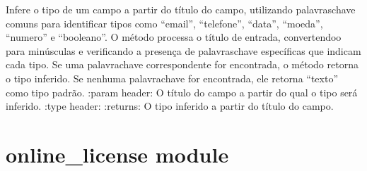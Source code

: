 \documentclass[letterpaper,10pt,english]{sphinxmanual}
\begin{document}
\begin{fulllineitems}
\label{\detokenize{api/models:models.infer_type_from_title}}
\pysigstartsignatures
\pysiglinewithargsret
{}
{}
{}
\pysigstopsignatures
\sphinxAtStartPar
Infere o tipo de um campo a partir do título do campo, utilizando palavras\sphinxhyphen{}chave comuns para identificar tipos como “email”, “telefone”, “data”, “moeda”, “numero” e “booleano”. O método processa o título de entrada, convertendo\sphinxhyphen{}o para minúsculas e verificando a presença de palavras\sphinxhyphen{}chave específicas que indicam cada tipo. Se uma palavra\sphinxhyphen{}chave correspondente for encontrada, o método retorna o tipo inferido. Se nenhuma palavra\sphinxhyphen{}chave for encontrada, ele retorna “texto” como tipo padrão.
:param header: O título do campo a partir do qual o tipo será inferido.
:type header: 
:returns: O tipo inferido a partir do título do campo.
\begin{quote}\begin{description}
\sphinxAtStartPar
{}

\end{description}\end{quote}

\end{fulllineitems}


\sphinxstepscope


\section{online\_license module}
\label{\detokenize{api/online_license:module-online_license}}\label{\detokenize{api/online_license:online-license-module}}\label{\detokenize{api/online_license::doc}}
\end{document}
